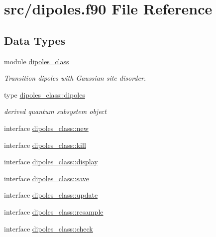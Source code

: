 \hypertarget{dipoles_8f90}{\section{src/dipoles.f90 File Reference}
\label{dipoles_8f90}
}
\subsection*{Data Types}
\begin{DoxyCompactItemize}
\item 
module \hyperlink{classdipoles__class}{dipoles\+\_\+class}
\begin{DoxyCompactList}\small\item\em Transition dipoles with Gaussian site disorder. \end{DoxyCompactList}\item 
type \hyperlink{structdipoles__class_1_1dipoles}{dipoles\+\_\+class\+::dipoles}
\begin{DoxyCompactList}\small\item\em derived quantum subsystem object \end{DoxyCompactList}\item 
interface \hyperlink{interfacedipoles__class_1_1new}{dipoles\+\_\+class\+::new}
\item 
interface \hyperlink{interfacedipoles__class_1_1kill}{dipoles\+\_\+class\+::kill}
\item 
interface \hyperlink{interfacedipoles__class_1_1display}{dipoles\+\_\+class\+::display}
\item 
interface \hyperlink{interfacedipoles__class_1_1save}{dipoles\+\_\+class\+::save}
\item 
interface \hyperlink{interfacedipoles__class_1_1update}{dipoles\+\_\+class\+::update}
\item 
interface \hyperlink{interfacedipoles__class_1_1resample}{dipoles\+\_\+class\+::resample}
\item 
interface \hyperlink{interfacedipoles__class_1_1check}{dipoles\+\_\+class\+::check}
\end{DoxyCompactItemize}
